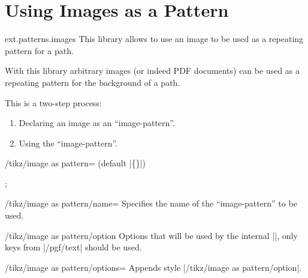 %
%
%
\clearpage
\section{Using Images as a Pattern}
\label{library:patterns.images}

\begin{tikzlibrary}{ext.patterns.images}
  This library allows to use an image to be used as a repeating pattern for a path.
\end{tikzlibrary}

With this library arbitrary images (or indeed PDF documents) can be used as
a repeating pattern for the background of a path.

This is a two-step process:
\begin{enumerate}
\item Declaring an image as an ``image-pattern''.
\item Using the ``image-pattern''.
\end{enumerate}

\begin{command}{\pgfsetupimageaspattern{}}
\end{command}

\begin{key}{/tikz/image as pattern= (default |\{\}|)}

\begin{codeexample}[preamble=\usetikzlibrary{ext.patterns.images,shapes.geometric}]
\tikz \node[star, minimum size=3cm, draw,
  image as pattern={name=grid,options={left, bottom, y=-.5cm, rotate=45}}] {};
\end{codeexample}
\end{key}

\begin{key}{/tikz/image as pattern/name=}
Specifies the name of the ``image-pattern'' to be used.
\end{key}

\begin{stylekey}{/tikz/image as pattern/option}
Options that will be used by the internal |\pgftext|,\indexCommandO{\pgftext}
only keys from |/pgf/text| should be used.
\end{stylekey}

\begin{stylekey}{/tikz/image as pattern/options=}
Appends style |/tikz/image as pattern/option|.
\end{stylekey}
